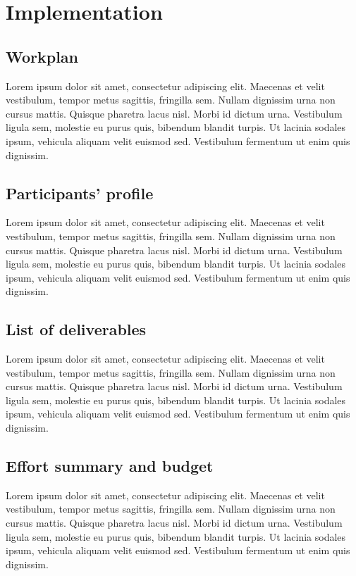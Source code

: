 \chapter{Implementation}
\label{sec:implementation}


\section{Workplan}
Lorem ipsum dolor sit amet, consectetur adipiscing elit. Maecenas et velit vestibulum, tempor metus sagittis, fringilla sem. Nullam dignissim urna non cursus mattis. Quisque pharetra lacus nisl. Morbi id dictum urna. Vestibulum ligula sem, molestie eu purus quis, bibendum blandit turpis. Ut lacinia sodales ipsum, vehicula aliquam velit euismod sed. Vestibulum fermentum ut enim quis dignissim.

\section{Participants’ profile}
Lorem ipsum dolor sit amet, consectetur adipiscing elit. Maecenas et velit vestibulum, tempor metus sagittis, fringilla sem. Nullam dignissim urna non cursus mattis. Quisque pharetra lacus nisl. Morbi id dictum urna. Vestibulum ligula sem, molestie eu purus quis, bibendum blandit turpis. Ut lacinia sodales ipsum, vehicula aliquam velit euismod sed. Vestibulum fermentum ut enim quis dignissim.

\section{List of deliverables}
Lorem ipsum dolor sit amet, consectetur adipiscing elit. Maecenas et velit vestibulum, tempor metus sagittis, fringilla sem. Nullam dignissim urna non cursus mattis. Quisque pharetra lacus nisl. Morbi id dictum urna. Vestibulum ligula sem, molestie eu purus quis, bibendum blandit turpis. Ut lacinia sodales ipsum, vehicula aliquam velit euismod sed. Vestibulum fermentum ut enim quis dignissim.

\section{Effort summary and budget}
Lorem ipsum dolor sit amet, consectetur adipiscing elit. Maecenas et velit vestibulum, tempor metus sagittis, fringilla sem. Nullam dignissim urna non cursus mattis. Quisque pharetra lacus nisl. Morbi id dictum urna. Vestibulum ligula sem, molestie eu purus quis, bibendum blandit turpis. Ut lacinia sodales ipsum, vehicula aliquam velit euismod sed. Vestibulum fermentum ut enim quis dignissim.

